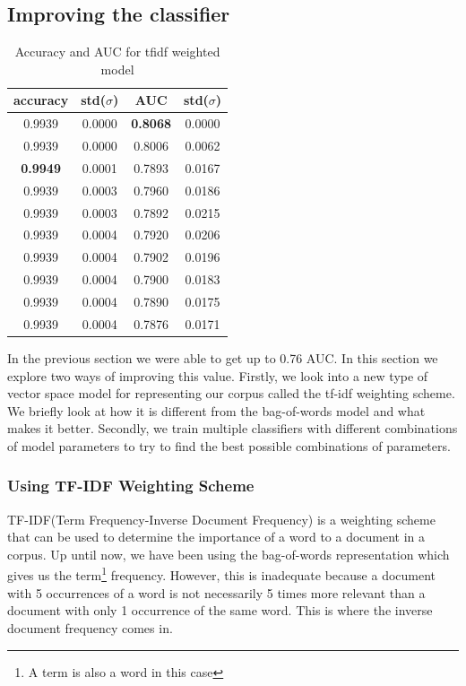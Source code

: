 \subsection{Improving the classifier}

\begin{table}
  \centering
  \begin{tabular}{cccc} \toprule
    accuracy        & std($\sigma$) & AUC             & std($\sigma$) \\ \midrule
    0.9939          & 0.0000        & \textbf{0.8068} & 0.0000 \\
    0.9939          & 0.0000        & 0.8006          & 0.0062 \\
    \textbf{0.9949} & 0.0001        & 0.7893          & 0.0167 \\
    0.9939          & 0.0003        & 0.7960          & 0.0186 \\
    0.9939          & 0.0003        & 0.7892          & 0.0215 \\ \midrule
    0.9939          & 0.0004        & 0.7920          & 0.0206 \\
    0.9939          & 0.0004        & 0.7902          & 0.0196 \\
    0.9939          & 0.0004        & 0.7900          & 0.0183 \\
    0.9939          & 0.0004        & 0.7890          & 0.0175 \\
    0.9939          & 0.0004        & 0.7876          & 0.0171 \\ \bottomrule
  \end{tabular}
    \caption{Accuracy and AUC for tfidf weighted model}
    \label{tab:tfidf-model-table}
\end{table}

In the previous section we were able to get up to 0.76 AUC\@. In this section we explore two ways of
improving this value. Firstly, we look into a new type of vector space model for representing our
corpus called the tf-idf weighting scheme. We briefly look at how it is different from the
bag-of-words model and what makes it better. Secondly, we train multiple classifiers with different
combinations of model parameters to try to find the best possible combinations of parameters.


\subsubsection{Using TF-IDF Weighting Scheme} TF-IDF(Term Frequency-Inverse Document Frequency) is a
weighting scheme that can be used to determine the importance of a word to a document in a corpus.
Up until now, we have been using the bag-of-words representation which gives us the term\footnote{A
term is also a word in this case} frequency. However, this is inadequate because a document with 5
occurrences of a word is not necessarily 5 times more relevant than a document with only 1
occurrence of the same word. This is where the inverse document frequency comes in.

